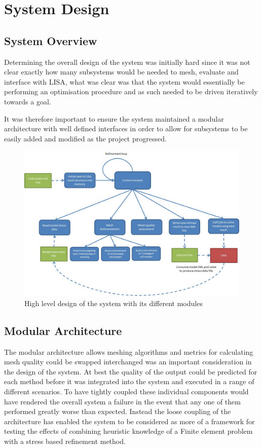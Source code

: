 \documentclass{article}
\begin{document}
\section{System Design}


\subsection{System Overview}
Determining the overall design of the system was initially hard since it was not clear exactly how many subsystems would be needed to mesh, evaluate and interface with LISA, what was clear was that the system would essentially be performing an optimisation procedure and as such needed to be driven iteratively towards a goal. 

 It was therefore important to ensure the system maintained a modular architecture with well defined interfaces in order to allow for subsystems to be easily added and modified as the project progressed.


\begin{figure}
  \centerline{\includegraphics[width=150mm, scale=1]{SystemDesignDiagram.jpeg}}
  \caption{High level design of the system with its different modules}
  \label{fig:h-refinementImp}
\end{figure}


\subsection{Modular Architecture}
The modular architecture allows meshing algorithms and metrics for calculating mesh quality could be swapped interchanged was an important consideration in the design of the system. At best the quality of the output could be predicted for each method before it was integrated into the system and executed in a range of different scenarios. To have tightly coupled these individual components would have rendered the overall system a failure in the event that any one of them performed greatly worse than expected. Instead the loose coupling of the architecture has enabled the system to be considered as more of a framework for testing the effects of combining heuristic knowledge of a Finite element problem with a stress based refinement method.
\end{document}
